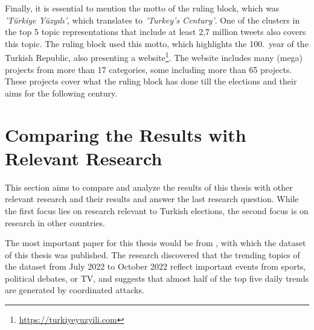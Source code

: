Finally, it is essential to mention the motto of the ruling block, which was 
\textit{'Türkiye Yüzyılı'}, which translates to \textit{'Turkey's Century'}. One of the clusters 
in the top 5 topic representations that include at least 2,7 million tweets also covers this topic. 
The ruling block used this motto, which highlights the 100.\ year of the Turkish Republic, also 
presenting a website\footnote{\url{https://turkiyeyuzyili.com}}. The website includes many 
(mega) projects from more than 17 categories, some including more than 65 projects. 
These projects cover what the ruling block has done till the elections and their aims for the 
following century.



\section{Comparing the Results with Relevant Research}\label{section:comparing_results}

This section aims to compare and analyze the results of this thesis with other relevant research and 
their results and answer the last research question. While the first focus lies on research relevant 
to Turkish elections, the second focus is on research in other countries.

The most important paper for this thesis would be from \textcite{secim2023}, with which the dataset 
of this thesis was published. The research discovered that the trending topics of the dataset from 
July 2022 to October 2022 reflect important events from sports, political debates, or TV, and 
suggests that almost half of the top five daily trends are generated by coordinated attacks. 

